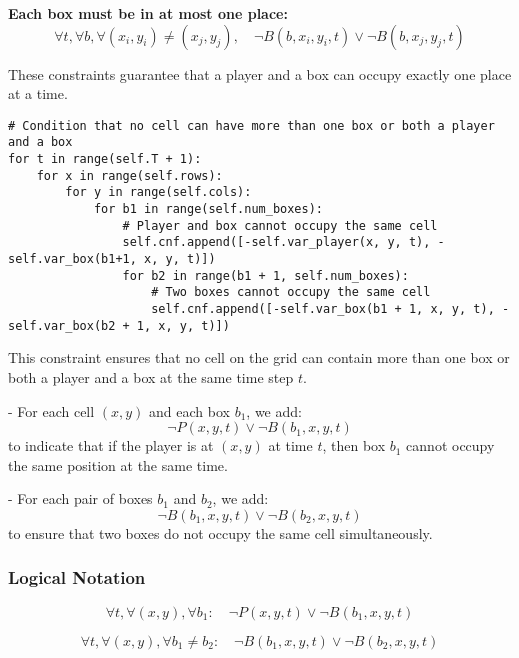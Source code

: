 \documentclass[12pt,a4paper]{article}
\begin{document}
\textbf{Each box must be in at most one place:}
\[
\forall t, \forall b, \forall (x_i, y_i) \neq (x_j, y_j), \quad \neg B(b, x_i, y_i, t) \lor \neg B(b, x_j, y_j, t)
\]

These constraints guarantee that a player and a box can occupy exactly one place at a time.



\begin{lstlisting}
# Condition that no cell can have more than one box or both a player and a box
for t in range(self.T + 1):
    for x in range(self.rows):
        for y in range(self.cols):
            for b1 in range(self.num_boxes):
                # Player and box cannot occupy the same cell
                self.cnf.append([-self.var_player(x, y, t), -self.var_box(b1+1, x, y, t)])
                for b2 in range(b1 + 1, self.num_boxes):
                    # Two boxes cannot occupy the same cell
                    self.cnf.append([-self.var_box(b1 + 1, x, y, t), -self.var_box(b2 + 1, x, y, t)])
\end{lstlisting}

This constraint ensures that no cell on the grid can contain more than one box or both a player and a box at the same time step \(t\).  

- For each cell \((x,y)\) and each box \(b_1\), we add:
\[
\neg P(x,y,t) \lor \neg B(b_1, x, y, t)
\]
to indicate that if the player is at \((x,y)\) at time \(t\), then box \(b_1\) cannot occupy the same position at the same time.  

- For each pair of boxes \(b_1\) and \(b_2\), we add:
\[
\neg B(b_1, x, y, t) \lor \neg B(b_2, x, y, t)
\]
to ensure that two boxes do not occupy the same cell simultaneously.

\subsubsection*{Logical Notation}

\[
\forall t, \forall (x,y), \forall b_1: \quad \neg P(x,y,t) \lor \neg B(b_1,x,y,t)
\]

\[
\forall t, \forall (x,y), \forall b_1 \neq b_2: \quad \neg B(b_1,x,y,t) \lor \neg B(b_2,x,y,t)
\]

\newpage
\end{document}
